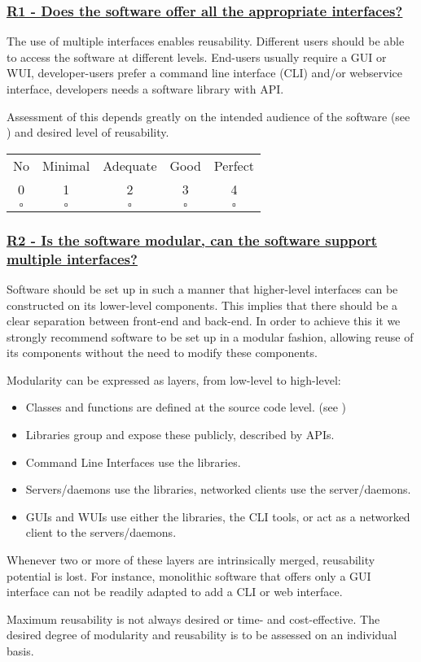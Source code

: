 \documentclass[a4paper,11pt]{article}
\newcommand{\criterion}[2]{\subsubsection*{\underline{#1 - #2}}\label{id:#1}}
\newcommand\CheckTable{%
  \begin{tabular}{ccccc}
    No & Minimal & Adequate & Good & Perfect \\
    0 & 1 & 2 & 3 & 4 \\
    \hline
    $\square$ & $\square$ & $\square$ & $\square$ & $\square$ \\
  \end{tabular}%
}
\newcommand{\refcrit}[1]{%
 \framebox[1.1\width]{\hyperref[id:#1]{#1}}
}
\begin{document}
\newcommand{\rOneID}{R1}
\newcommand{\rOneText}{Does the software offer all the appropriate interfaces?}
\criterion{\rOneID}{\rOneText}

The use of multiple interfaces enables reusability. Different users should be
able to access the software at different levels. End-users usually require a
GUI or WUI, developer-users prefer a command line interface (CLI) and/or
webservice interface, developers needs a software library with API.

Assessment of this depends greatly on the intended audience of the software
(see \refcrit{U2}) and desired level of reusability.

\CheckTable

\newcommand{\rTwoID}{R2}
\newcommand{\rTwoText}{Is the software modular, can the software support multiple interfaces?}
\criterion{\rTwoID}{\rTwoText}

Software should be set up in such a manner that higher-level interfaces can be
constructed on its lower-level components. This implies that there should be a
clear separation between front-end and back-end. In order to achieve this it we
strongly recommend software to be set up in a modular fashion, allowing reuse
of its components without the need to modify these components.

Modularity can be expressed as layers, from low-level to high-level:

\begin{itemize}
 \item Classes and functions are defined at the source code level. (see
     \refcrit{R3})
 \item Libraries group and expose these publicly, described by APIs. 
 \item Command Line Interfaces use the libraries.
 \item Servers/daemons use the libraries, networked clients use the server/daemons.
 \item GUIs and WUIs use either the libraries, the CLI tools, or act as a networked client to the servers/daemons.
\end{itemize}

Whenever two or more of these layers are intrinsically merged, reusability potential is lost.
For instance, monolithic software that offers only a GUI interface can not be
readily adapted to add a CLI or web interface.

Maximum reusability is not always desired or time- and cost-effective. The
desired degree of modularity and reusability is to be assessed on an
individual basis.
\end{document}
